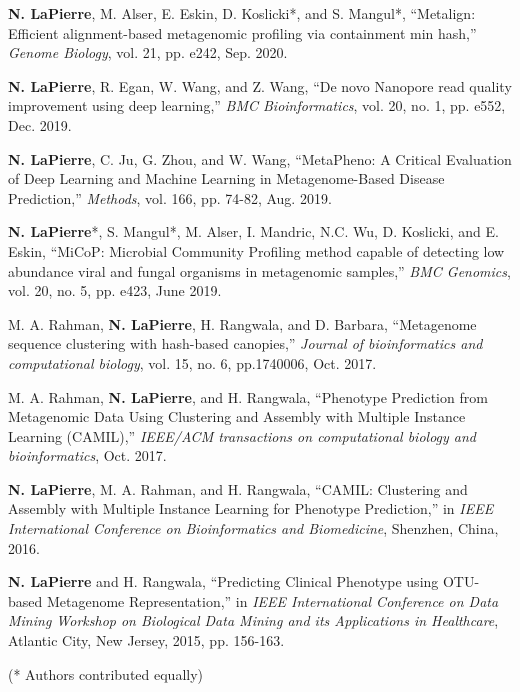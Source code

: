\documentclass[margin, 10pt]{res} %
\begin{document}
\begin{resume}
\textbf{N. LaPierre}, M. Alser, E. Eskin, D. Koslicki*, and S. Mangul*, ``Metalign: Efficient alignment-based metagenomic profiling via containment min hash,'' \emph{Genome Biology}, vol. 21, pp. e242, Sep. 2020.


\textbf{N. LaPierre}, R. Egan, W. Wang, and Z. Wang, ``De novo Nanopore read quality improvement using deep learning,'' \emph{BMC Bioinformatics}, vol. 20, no. 1, pp. e552, Dec. 2019.

\textbf{N. LaPierre}, C. Ju, G. Zhou, and W. Wang, ``MetaPheno: A Critical Evaluation of Deep Learning and Machine Learning in Metagenome-Based Disease Prediction,'' \emph{Methods}, vol. 166, pp. 74-82, Aug. 2019.

\textbf{N. LaPierre}*, S. Mangul*, M. Alser, I. Mandric, N.C. Wu, D. Koslicki, and E. Eskin, ``MiCoP: Microbial Community Profiling method capable of detecting low abundance viral and fungal organisms in metagenomic samples,'' \emph{BMC Genomics}, vol. 20, no. 5, pp. e423, June 2019.

M. A. Rahman, \textbf{N. LaPierre}, H. Rangwala, and D. Barbara, ``Metagenome sequence clustering with hash-based canopies,'' \emph{Journal of bioinformatics and computational biology}, vol. 15, no. 6, pp.1740006, Oct. 2017.

M. A. Rahman, \textbf{N. LaPierre}, and H. Rangwala, ``Phenotype Prediction from Metagenomic Data Using Clustering and Assembly with Multiple Instance Learning (CAMIL),'' \emph{IEEE/ACM transactions on computational biology and bioinformatics}, Oct. 2017. 

\textbf{N. LaPierre}, M. A. Rahman, and H. Rangwala, ``CAMIL: Clustering and Assembly with Multiple Instance Learning for Phenotype Prediction,'' in {\sl IEEE International Conference on Bioinformatics and Biomedicine}, Shenzhen, China, 2016.

\textbf{N. LaPierre} and H. Rangwala, ``Predicting Clinical Phenotype using OTU-based Metagenome Representation,'' in {\sl IEEE International Conference on Data Mining Workshop on Biological Data Mining and its Applications in Healthcare}, Atlantic City, New Jersey, 2015, pp. 156-163.

(*  Authors contributed equally)


\end{resume}
\end{document}
